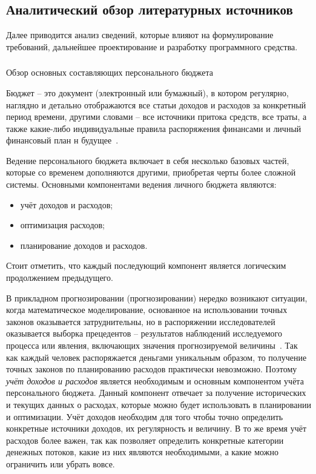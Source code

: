 \subsection{Аналитический обзор литературных источников}
\label{sec:analysis:literature}

Далее приводится анализ сведений, которые влияют на формулирование требований, дальнейшее проектирование и разработку программного средства.

\subsubsection{} Обзор основных составляющих персонального бюджета
\label{sec:analysis:literature:components}

Бюджет -- это документ (электронный или бумажный), в котором регулярно, наглядно и детально отображаются все статьи доходов и расходов за конкретный период времени, другими словами -- все источники притока средств, все траты, а также какие-либо индивидуальные правила распоряжения финансами и личный финансовый план н будущее~\cite{budget_blog}.

Ведение персонального бюджета включает в себя несколько базовых частей, которые со временем дополняются другими, приобретая черты более сложной системы.
Основными компонентами ведения личного бюджета являются:
\begin{itemize}
    \item учёт доходов и расходов;
    \item оптимизация расходов;
    \item планирование доходов и расходов.
\end{itemize}

Стоит отметить, что каждый последующий компонент является логическим продолжением предыдущего.

В прикладном прогнозировании (прогнозировании) нередко возникают ситуации, когда математическое моделирование, основанное на использовании точных законов оказывается затруднительны, но в распоряжении исследователей оказывается выборка прецедентов -- результатов наблюдений исследуемого процесса или явления, включающих значения прогнозируемой величины~\cite{prediction_basics}.
Так как каждый человек распоряжается деньгами уникальным образом, то получение точных законов по планированию расходов практически невозможно.
Поэтому \emph{учёт доходов и расходов} является необходимым и основным компонентом учёта персонального бюджета.
Данный компонент отвечает за получение исторических и текущих данных о расходах, которые можно будет использовать в планировании и оптимизации.
Учёт доходов необходим для того чтобы точно определить конкретные источники доходов, их регулярность и величину.
В то же время учёт расходов более важен, так как позволяет определить конкретные категории денежных потоков, какие из них являются необходимыми, а какие можно ограничить или убрать вовсе.

